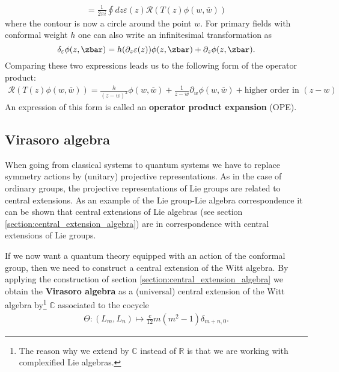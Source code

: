     \begin{gather}
        [Q_\varepsilon, \phi(w, \overline{w})] = \frac{1}{2\pi i}\oint dz\varepsilon(z)\mathcal{R}(T(z)\phi(w, \overline{w}))
    \end{gather}
    where the contour is now a circle around the point $w$. For primary fields with conformal weight $h$ one can also write an infinitesimal transformation as \[\delta_\varepsilon\phi(z, \zbar) = h(\partial_z\varepsilon(z))\phi(z, \zbar) + \partial_z\phi(z, \zbar).\] Comparing these two expressions leads us to the following form of the operator product:
    \begin{gather}
        \mathcal{R}(T(z)\phi(w, \overline{w})) = \frac{h}{(z-w)^2}\phi(w, \overline{w}) + \frac{1}{z-w}\partial_w\phi(w, \overline{w}) + \text{higher order in } (z-w)
    \end{gather}
    An expression of this form is called an \textbf{operator product expansion} (OPE).

\subsection{Virasoro algebra}

    When going from classical systems to quantum systems we have to replace symmetry actions by (unitary) projective representations. As in the case of ordinary groups, the projective representations of Lie groups are related to central extensions. As an example of the Lie group-Lie algebra correspondence it can be shown that central extensions of Lie algebras (see section \ref{section:central_extension_algebra}) are in correspondence with central extensions of Lie groups.

    If we now want a quantum theory equipped with an action of the conformal group, then we need to construct a central extension of the Witt algebra. By applying the construction of section \ref{section:central_extension_algebra} we obtain the \textbf{Virasoro algebra} as a (universal) central extension of the Witt algebra by\footnote{The reason why we extend by $\mathbb{C}$ instead of $\mathbb{R}$ is that we are working with complexified Lie algebras.} $\mathbb{C}$ associated to the cocycle
    \begin{gather}
        \Theta:(L_m, L_n)\mapsto\frac{c}{12}m(m^2-1)\delta_{m+n, 0}.
    \end{gather}

